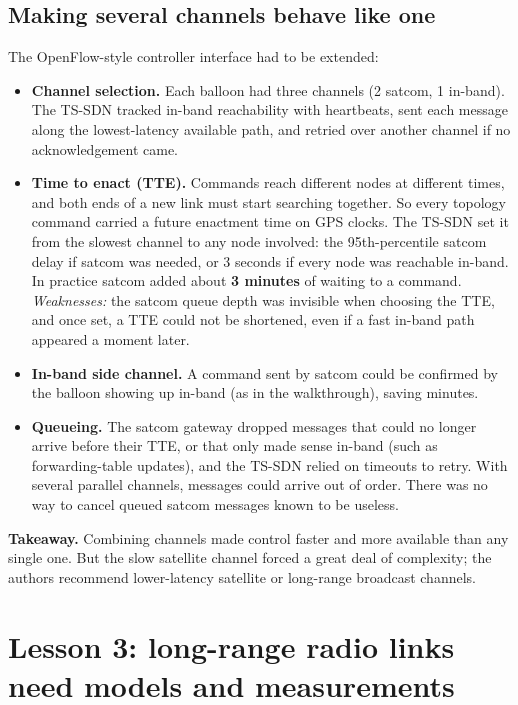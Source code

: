 \subsection{Making several channels behave like one}
The OpenFlow-style controller interface had to be extended:
\begin{itemize}
  \item \textbf{Channel selection.} Each balloon had three channels (2 satcom, 1 in-band). The TS-SDN tracked in-band reachability with heartbeats, sent each message along the
        lowest-latency available path, and retried over another channel if no acknowledgement came.
  \item \textbf{Time to enact (TTE).} Commands reach different nodes at different times, and both ends of a new link must start searching together. So every topology command
        carried a future enactment time on GPS clocks. The TS-SDN set it from the slowest channel to any node involved: the 95th-percentile satcom delay if satcom was needed,
        or 3 seconds if every node was reachable in-band. In practice satcom added about \textbf{3 minutes} of waiting to a command.
        \emph{Weaknesses:} the satcom queue depth was invisible when choosing the TTE, and once set, a TTE could not be shortened, even if a fast in-band path appeared a moment later.
  \item \textbf{In-band side channel.} A command sent by satcom could be confirmed by the balloon showing up in-band (as in the walkthrough), saving minutes.
  \item \textbf{Queueing.} The satcom gateway dropped messages that could no longer arrive before their TTE, or that only made sense in-band (such as forwarding-table updates),
        and the TS-SDN relied on timeouts to retry. With several parallel channels, messages could arrive out of order. There was no way to cancel queued satcom messages known to
        be useless.
\end{itemize}

\textbf{Takeaway.} Combining channels made control faster and more available than any single one. But the slow satellite channel forced a great deal of complexity; the authors
recommend lower-latency satellite or long-range broadcast channels.

\section{Lesson 3: long-range radio links need models and measurements}

